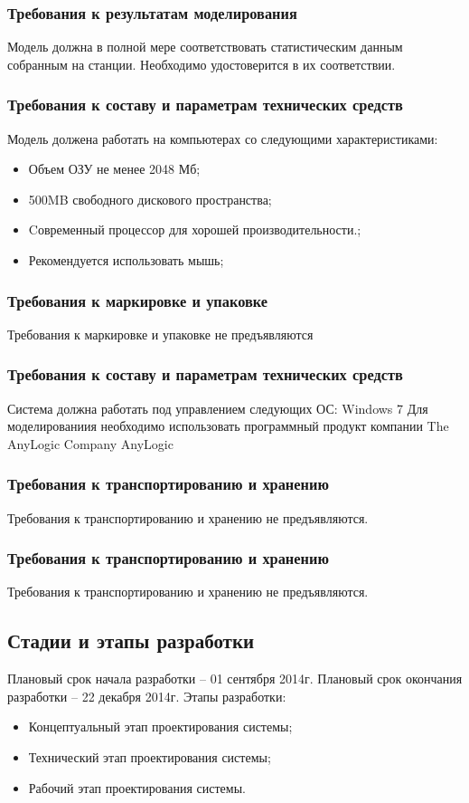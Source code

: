 \documentclass[12pt]{article}
\begin{document}
		\subsubsection{Требования к результатам моделирования}
		Модель должна в полной мере соответствовать статистическим данным собранным на станции. Необходимо удостоверится в их соответствии.  
		\subsubsection{Требования к составу и параметрам технических средств}
		Модель должена работать на компьютерах со следующими
характеристиками:
\begin{itemize}
	\item Объем ОЗУ не менее 2048 Мб;
	\item 500MB свободного дискового пространства;
	\item Cовременный процессор для хорошей производительности.;
	\item Рекомендуется использовать мышь;

\end{itemize}

		\subsubsection{Требования к маркировке и упаковке }
Требования к маркировке и упаковке не предъявляются
		\subsubsection{Требования к составу и параметрам технических средств}

Система должна работать под управлением следующих ОС: Windows 7
Для моделированиия необходимо использовать программный продукт компании  The AnyLogic Company AnyLogic
		\subsubsection{Требования к транспортированию и хранению }
Требования к транспортированию и хранению не предъявляются.
		\subsubsection{Требования к транспортированию и хранению}
		Требования к транспортированию и хранению не предъявляются.
				\subsection{Стадии и этапы разработки }
Плановый срок начала разработки – 01 сентября 2014г.
Плановый срок окончания разработки – 22 декабря 2014г.
Этапы разработки:
\begin{itemize}
	\item Концептуальный этап проектирования системы;
	\item Технический этап проектирования системы;
	\item Рабочий этап проектирования системы.
\end{itemize}
\end{document}
